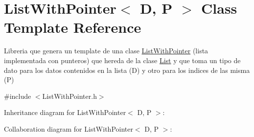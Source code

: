 \hypertarget{class_list_with_pointer}{\section{List\+With\+Pointer$<$ D, P $>$ Class Template Reference}
\label{class_list_with_pointer}
}


Libreria que genera un template de una clase \hyperlink{class_list_with_pointer}{List\+With\+Pointer} (lista implementada con punteros) que hereda de la clase \hyperlink{class_list}{List} y que toma un tipo de dato para los datos contenidos en la lista (D) y otro para los indices de las misma (P)  




{\ttfamily \#include $<$List\+With\+Pointer.\+h$>$}



Inheritance diagram for List\+With\+Pointer$<$ D, P $>$\+:


Collaboration diagram for List\+With\+Pointer$<$ D, P $>$\+:
